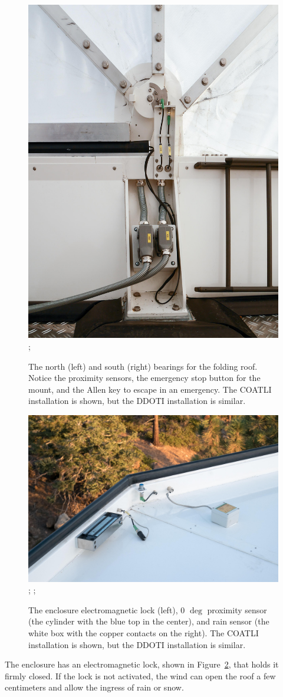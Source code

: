 \begin{figure}
\begin{center}
{\begin{labeled}{\includegraphics[width=0.48\linewidth]{figures/enclosure-bearing-south.jpg}}
;
\end{labeled}}
\end{center}
\caption{The north (left) and south (right) bearings for the folding roof. Notice the proximity sensors, the emergency stop button for the mount, and the Allen key to escape in an emergency.
\ifddotioan
The COATLI installation is shown, but the DDOTI installation is similar.
\fi
}
\label{figure:enclosure-bearing-north}
\label{figure:enclosure-beating-south}
\end{figure}


\begin{figure}
\begin{center}
\begin{labeled}{\includegraphics[width=0.8\linewidth]{figures/enclosure-electromagnetic-lock.jpg}}
;
;
\end{labeled}
\end{center}
\caption{The enclosure electromagnetic lock (left), 0 $\deg$ proximity sensor (the cylinder with the blue top in the center), and rain sensor (the white box with the copper contacts on the right).
\ifddotioan
The COATLI installation is shown, but the DDOTI installation is similar.
\fi
}
\label{figure:enclosure-electromagnetic-lock}
\end{figure}

The enclosure has an electromagnetic lock, shown in Figure~\ref{figure:enclosure-electromagnetic-lock}, that holds it firmly closed. If the lock is not activated, the wind can open the roof a few centimeters and allow the ingress of rain or snow.

